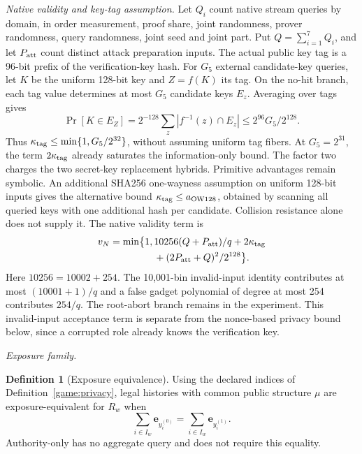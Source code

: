 \documentclass[conference,compsoc]{IEEEtran}
\theoremstyle{definition}
\newtheorem{definition}{Definition}[section]
\newtheorem{definition}{Definition}
\numberwithin{equation}{section}
\numberwithin{table}{section}
\numberwithin{figure}{section}
\theoremstyle{plain}
\begin{document}
\par\noindent\emph{Native validity and key-tag assumption.}
Let \(Q_i\) count native stream queries by domain, in order measurement,
proof share, joint randomness, prover randomness, query randomness, joint
seed and joint part. Put \(Q=\sum_{i=1}^{7}Q_i\), and let \(P_{\rm att}\)
count distinct attack preparation inputs. The actual public key tag is a
96-bit prefix of the verification-key hash. For \(G_5\) external candidate-key
queries, let \(K\) be the uniform 128-bit key and \(Z=f(K)\) its tag.
On the no-hit branch, each tag value determines at most \(G_5\) candidate
keys \(E_z\). Averaging over tags gives
\[
 \Pr[K\in E_Z]=2^{-128}\sum_z|f^{-1}(z)\cap E_z|
 \le 2^{96}G_5/2^{128}.
\]
Thus \(\kappa_{\rm tag}\le\min\{1,G_5/2^{32}\}\), without assuming
uniform tag fibers. At \(G_5=2^{31}\), the term \(2\kappa_{\rm tag}\)
already saturates the information-only bound. The factor two charges the
two secret-key replacement hybrids. Primitive advantages remain symbolic.
An additional SHA256 one-wayness assumption on uniform 128-bit inputs gives
the alternative bound \(\kappa_{\rm tag}\le a_{\rm OW128}\), obtained by
scanning all queried keys with one additional hash per candidate. Collision
resistance alone does not supply it.
The native validity term is
\begin{equation}
 \begin{split}
 v_N=\min\bigl\{1,{}&10256(Q+P_{\rm att})/q+2\kappa_{\rm tag}\\
                   &+(2P_{\rm att}+Q)^2/2^{128}\bigr\}.
 \end{split}
 \label{eq:native-validity-bound}
\end{equation}
Here \(10256=10002+254\). The 10,001-bin invalid-input identity contributes
at most \((10001+1)/q\) and a false gadget polynomial of degree at most 254
contributes \(254/q\). The root-abort branch remains in the experiment.
This invalid-input acceptance term is separate from the nonce-based privacy
bound below, since a corrupted role already knows the verification key.

\par\noindent\emph{Exposure family.}
\begin{definition}[Exposure equivalence]
\label{def:exposure-equivalence}
Using the declared indices of Definition~\ref{game:privacy}, legal histories
with common public structure \(\mu\) are exposure-equivalent for \(R_w\) when
\begin{equation}
 \sum_{i\in I_w}\mathbf e_{y_i^{(0)}}=
 \sum_{i\in I_w}\mathbf e_{y_i^{(1)}}.
 \label{eq:exposure-equivalence}
\end{equation}
Authority-only has no aggregate query and does not require this equality.
\end{definition}
\end{document}

